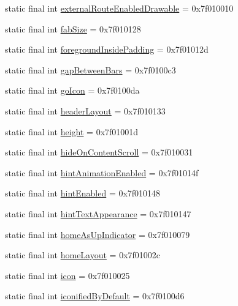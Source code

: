 \begin{CompactItemize}
\item 
static final int \hyperlink{classandroid_1_1support_1_1v4_1_1_r_1_1attr_7dfbd3facdcafd6ab6b4553cd425962e}{externalRouteEnabledDrawable} = 0x7f010010
\item 
static final int \hyperlink{classandroid_1_1support_1_1v4_1_1_r_1_1attr_0443d1b2a5dd1c72d6f44120ad17435f}{fabSize} = 0x7f010128
\item 
static final int \hyperlink{classandroid_1_1support_1_1v4_1_1_r_1_1attr_2829eea29c8d783a096aa6c738634060}{foregroundInsidePadding} = 0x7f01012d
\item 
static final int \hyperlink{classandroid_1_1support_1_1v4_1_1_r_1_1attr_92ae63e031e3bc6652f36bcdbef16a2a}{gapBetweenBars} = 0x7f0100c3
\item 
static final int \hyperlink{classandroid_1_1support_1_1v4_1_1_r_1_1attr_b459b88d28bea5ee88e533a6120a06e0}{goIcon} = 0x7f0100da
\item 
static final int \hyperlink{classandroid_1_1support_1_1v4_1_1_r_1_1attr_3e502de33ed3bc0aa35df547b0de9f71}{headerLayout} = 0x7f010133
\item 
static final int \hyperlink{classandroid_1_1support_1_1v4_1_1_r_1_1attr_a2acbef746ccc82d990fcd7240b96ccc}{height} = 0x7f01001d
\item 
static final int \hyperlink{classandroid_1_1support_1_1v4_1_1_r_1_1attr_a671e6698e7737a9495c216f60aef1b6}{hideOnContentScroll} = 0x7f010031
\item 
static final int \hyperlink{classandroid_1_1support_1_1v4_1_1_r_1_1attr_1d796d726b048380f046578fbb3431b7}{hintAnimationEnabled} = 0x7f01014f
\item 
static final int \hyperlink{classandroid_1_1support_1_1v4_1_1_r_1_1attr_bc2d3e45dfbd47790632aa0e094a3326}{hintEnabled} = 0x7f010148
\item 
static final int \hyperlink{classandroid_1_1support_1_1v4_1_1_r_1_1attr_f156908224e9095cd11a4097855b4f8a}{hintTextAppearance} = 0x7f010147
\item 
static final int \hyperlink{classandroid_1_1support_1_1v4_1_1_r_1_1attr_bc32b0eec3b75089c984565f65d51e30}{homeAsUpIndicator} = 0x7f010079
\item 
static final int \hyperlink{classandroid_1_1support_1_1v4_1_1_r_1_1attr_04ee478c4e24fa943d5a987a40056909}{homeLayout} = 0x7f01002c
\item 
static final int \hyperlink{classandroid_1_1support_1_1v4_1_1_r_1_1attr_af2e94ca2a651419be830ee2aa624bb5}{icon} = 0x7f010025
\item 
static final int \hyperlink{classandroid_1_1support_1_1v4_1_1_r_1_1attr_3f950dc7148d83204da2ad3e699f5815}{iconifiedByDefault} = 0x7f0100d6

\end{CompactItemize}
